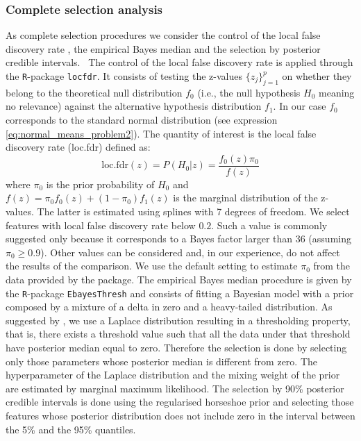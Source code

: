 \documentclass[american,]{article}
\theoremstyle{definition}
\begin{document}
\hypertarget{complete-selection}{%
\subsubsection{Complete selection analysis}\label{complete-selection}}
As complete selection procedures we consider the control of the local false discovery rate \citep{paper:efron, efron2012large}, the empirical Bayes median \citep{johnstone2004needles} and the selection by posterior credible intervals. 
\
The control of the local false discovery rate is applied through the \texttt{R}-package \texttt{locfdr}. It consists of testing the z-values $\{z_{j}\}_{j=1}^{p}$ on whether they belong to the theoretical null distribution $f_{0}$ (i.e., the null hypothesis $H_0$ meaning no relevance) against the alternative hypothesis distribution $f_{1}$. In our case $f_{0}$ corresponds to the standard normal distribution (see expression \eqref{eq:normal_means_problem2}). The quantity of interest is the local false discovery rate (loc.fdr) defined as:
\
\begin{equation}
\text{loc.fdr}(z)=P(H_{0}|z)=\frac{f_{0}(z)\pi_{0}}{f(z)}
\end{equation}
where $\pi_{0}$ is the prior probability of $H_0$ and $f(z)=\pi_{0}f_{0}(z)+(1-\pi_{0})f_{1}(z)$ is the marginal distribution of the z-values. The latter is estimated using splines with 7 degrees of freedom. We select features with local false discovery rate below $0.2$. Such a value is commonly suggested only because it corresponds to a Bayes factor larger than 36 (assuming $\pi_{0}\geq0.9$). Other values can be considered and, in our experience, do not affect the results of the comparison. We use the default setting to estimate $\pi_{0}$ from the data provided by the package.
The empirical Bayes median procedure is given by the \texttt{R}-package \texttt{EbayesThresh} and consists of fitting a Bayesian model with a prior composed by a mixture of a delta in zero and a heavy-tailed distribution. As suggested by \cite{johnstone2004needles}, we use a Laplace distribution resulting in a thresholding property, that is, there exists a threshold value such that all the data under that threshold have posterior median equal to zero. Therefore the selection is done by selecting only those parameters whose posterior median is different from zero. The hyperparameter of the Laplace distribution and the mixing weight of the prior are estimated by marginal maximum likelihood. 
The selection by 90\% posterior credible intervals is done using the regularised horseshoe prior and selecting those features whose posterior distribution does not include zero in the interval between the 5\% and the 95\% quantiles.
\end{document}
